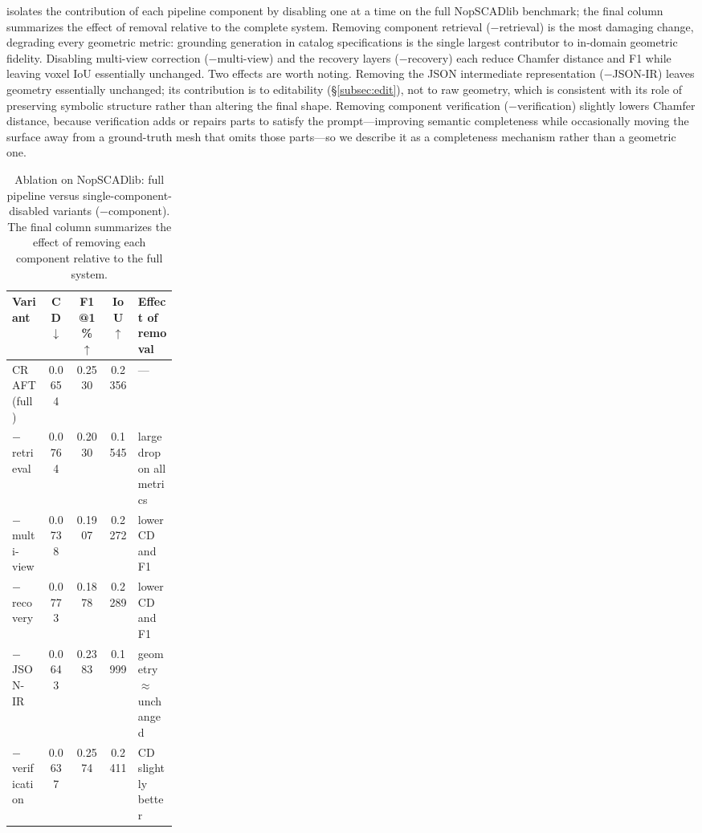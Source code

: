  isolates the contribution of each pipeline component by disabling one at a time on the full NopSCADlib benchmark; the final column summarizes the effect of removal relative to the complete system. Removing component retrieval ($-$retrieval) is the most damaging change, degrading every geometric metric: grounding generation in catalog specifications is the single largest contributor to in-domain geometric fidelity. Disabling multi-view correction ($-$multi-view) and the recovery layers ($-$recovery) each reduce Chamfer distance and F1 while leaving voxel IoU essentially unchanged. Two effects are worth noting. Removing the JSON intermediate representation ($-$JSON-IR) leaves geometry essentially unchanged; its contribution is to editability (\S\ref{subsec:edit}), not to raw geometry, which is consistent with its role of preserving symbolic structure rather than altering the final shape. Removing component verification ($-$verification) slightly lowers Chamfer distance, because verification adds or repairs parts to satisfy the prompt---improving semantic completeness while occasionally moving the surface away from a ground-truth mesh that omits those parts---so we describe it as a completeness mechanism rather than a geometric one.

\begin{table}[t]
\centering
\caption{Ablation on NopSCADlib: full pipeline versus single-component-disabled variants ($-$component). The final column summarizes the effect of removing each component relative to the full system.}
\label{tab:ablation-r}
\footnotesize
\setlength{\tabcolsep}{3pt}
\begin{tabular}{lcccp{0.24\linewidth}}
\toprule
Variant & CD$\downarrow$ & F1@1\%$\uparrow$ & IoU$\uparrow$ & Effect of removal \\
\midrule
CRAFT (full)      & 0.0654 & 0.2530 & 0.2356 & --- \\
$-$\,retrieval    & 0.0764 & 0.2030 & 0.1545 & large drop on all metrics \\
$-$\,multi-view   & 0.0738 & 0.1907 & 0.2272 & lower CD and F1 \\
$-$\,recovery     & 0.0773 & 0.1878 & 0.2289 & lower CD and F1 \\
$-$\,JSON-IR      & 0.0643 & 0.2383 & 0.1999 & geometry $\approx$ unchanged \\
$-$\,verification & 0.0637 & 0.2574 & 0.2411 & CD slightly better \\
\bottomrule
\end{tabular}
\end{table}

